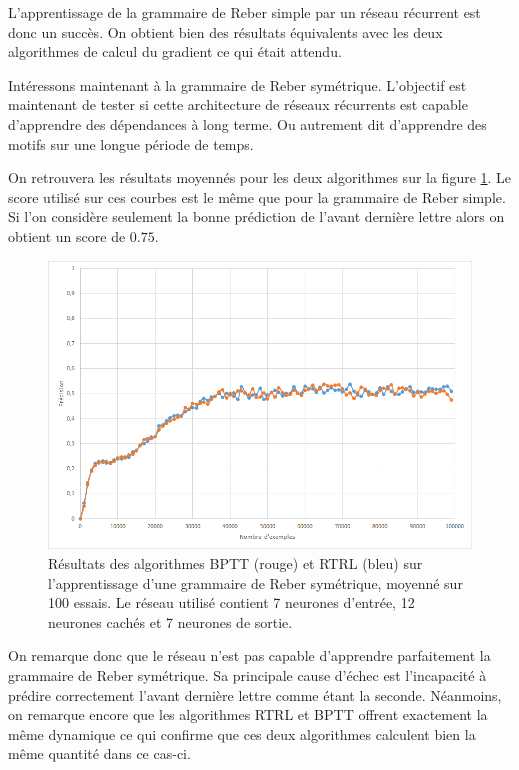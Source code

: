 L'apprentissage de la grammaire de Reber simple par un réseau récurrent est donc un succès. On obtient bien des résultats équivalents avec les deux algorithmes de calcul du gradient ce qui était attendu.

Intéressons maintenant à la grammaire de Reber symétrique. L'objectif est maintenant de tester si cette architecture de réseaux récurrents est capable d'apprendre des dépendances à long terme. Ou autrement dit d'apprendre des motifs sur une longue période de temps.

On retrouvera les résultats moyennés pour les deux algorithmes sur la figure \ref{curves_reber_double}. Le score utilisé sur ces courbes est le même que pour la grammaire de Reber simple. Si l'on considère seulement la bonne prédiction de l'avant dernière lettre alors on obtient un score de $0.75$.

\begin{figure}[h!]
\begin{center}
\includegraphics[scale=0.4]{images/chapter5/rtrl_bptt.png}
\caption{Résultats des algorithmes BPTT (rouge) et RTRL (bleu) sur l'apprentissage d'une grammaire de Reber symétrique, moyenné sur 100 essais. Le réseau utilisé contient 7 neurones d'entrée, 12 neurones cachés et 7 neurones de sortie.}
\label{curves_reber_double}
\end{center}
\end{figure}

On remarque donc que le réseau n'est pas capable d'apprendre parfaitement la grammaire de Reber symétrique. Sa principale cause d'échec est l'incapacité à prédire correctement l'avant dernière lettre comme étant la seconde. Néanmoins, on remarque encore que les algorithmes RTRL et BPTT offrent exactement la même dynamique ce qui confirme que ces deux algorithmes calculent bien la même quantité dans ce cas-ci.

